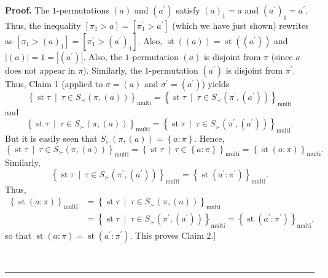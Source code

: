\documentclass[numbers=enddot,12pt,final,onecolumn,notitlepage]{scrartcl}%
\theoremstyle{definition}
\newenvironment{proof}[1][Proof]{\noindent\textbf{#1.} }{\ \rule{0.5em}{0.5em}}
\newenvironment{verlong}{}{}
\begin{document}
\begin{verlong}
\begin{proof}
The $1$-permutations $\left(  a\right)  $ and $\left(  a^{\prime}\right)  $
satisfy $\left(  a\right)  _{1}=a$ and $\left(  a^{\prime}\right)
_{1}=a^{\prime}$. Thus, the inequality $\left[\pi_1>a\right]
= \left[\pi^\prime_1>a^\prime\right]$ (which we have just shown) rewrites
as $\left[  \pi_1 > \left(  a\right)  _{1}\right]  =\left[  \pi^\prime_1
> \left(  a^{\prime}\right)  _{1}\right]  $. Also, $\operatorname{st}\left(
\left(  a\right)  \right)  =\operatorname{st}\left(  \left(  a^{\prime
}\right)  \right)  $ and $\left\vert \left(  a\right)  \right\vert
=1=\left\vert \left(  a^{\prime}\right)  \right\vert $. Also, the
$1$-permutation $\left(  a\right)  $ is disjoint from $\pi$ (since $a$ does
not appear in $\pi$). Similarly, the $1$-permutation $\left(  a^{\prime
}\right)  $ is disjoint from $\pi^{\prime}$. Thus, Claim 1 (applied to
$\sigma=\left(  a\right)  $ and $\sigma^{\prime}=\left(  a^{\prime}\right)  $)
yields
\[
\left\{  \operatorname{st} \tau   \ \mid\ \tau\in S_{\prec
}\left(  \pi,\left(  a\right)  \right)  \right\}  _{\operatorname*{multi}%
}=\left\{  \operatorname{st} \tau   \ \mid\ \tau\in S_{\prec
}\left(  \pi^{\prime},\left(  a^{\prime}\right)  \right)  \right\}
_{\operatorname*{multi}}%
\]
and%
\[
\left\{  \operatorname{st} \tau   \ \mid\ \tau\in S_{\succ
}\left(  \pi,\left(  a\right)  \right)  \right\}  _{\operatorname*{multi}%
}=\left\{  \operatorname{st} \tau   \ \mid\ \tau\in S_{\succ
}\left(  \pi^{\prime},\left(  a^{\prime}\right)  \right)  \right\}
_{\operatorname*{multi}}.
\]
But it is easily seen that $S_{\succ}\left(  \pi,\left(  a\right)  \right)
=\left\{  a:\pi\right\}  $. Hence,%
\[
\left\{  \operatorname{st} \tau   \ \mid\ \tau\in S_{\succ
}\left(  \pi,\left(  a\right)  \right)  \right\}  _{\operatorname*{multi}%
}=\left\{  \operatorname{st} \tau   \ \mid\ \tau\in\left\{
a:\pi\right\}  \right\}  _{\operatorname*{multi}}=\left\{  \operatorname{st}
\left(  a:\pi\right)  \right\}  _{\operatorname*{multi}}.
\]
Similarly,%
\[
\left\{  \operatorname{st} \tau   \ \mid\ \tau\in S_{\succ
}\left(  \pi^{\prime},\left(  a^{\prime}\right)  \right)  \right\}
_{\operatorname*{multi}}=\left\{  \operatorname{st}\left(  a^{\prime}%
:\pi^{\prime}\right)  \right\}  _{\operatorname*{multi}}.
\]
Thus,%
\begin{align*}
\left\{  \operatorname{st}\left(  a:\pi\right)  \right\}
_{\operatorname*{multi}}  &  =\left\{  \operatorname{st} \tau 
\ \mid\ \tau\in S_{\succ}\left(  \pi,\left(  a\right)  \right)  \right\}
_{\operatorname*{multi}}\\
&  =\left\{  \operatorname{st} \tau   \ \mid\ \tau\in S_{\succ
}\left(  \pi^{\prime},\left(  a^{\prime}\right)  \right)  \right\}
_{\operatorname*{multi}}=\left\{  \operatorname{st}\left(  a^{\prime}%
:\pi^{\prime}\right)  \right\}  _{\operatorname*{multi}},
\end{align*}
so that $\operatorname{st}\left(  a:\pi\right)  =\operatorname{st}\left(
a^{\prime}:\pi^{\prime}\right)  $. This proves Claim 2.]


\end{proof}
\end{verlong}
\end{document}
